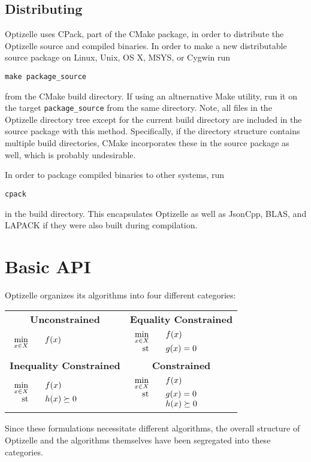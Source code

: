 \documentclass{report}
\makeatletter
\newcommand{\textct}{\begingroup\@activeus\@textct}
\newcommand*{\@textct}[1]{\texttt{#1}\endgroup}
\newcommand{\st}{\textnormal{st}}
\newcommand{\unconstrained}{\begin{array}[t]{rcl}\min\limits_{x\in X}&& f(x)\end{array}}
\newcommand{\equalityConstrained}{\begin{array}[t]{rcl}\min\limits_{x\in X}&&f(x)\\\st && g(x)=0\end{array}}
\newcommand{\inequalityConstrained}{\begin{array}[t]{rcl}\min\limits_{x\in X}&&f(x)\\\st && h(x)\succeq 0\end{array}}
\newcommand{\constrained}{\begin{array}[t]{rcl}\min\limits_{x\in X}&&f(x)\\\st && g(x)=0\\&&h(x)\succeq 0\end{array}}
\makeatother
\begin{document}
\section{Distributing}

        Optizelle uses CPack, part of the CMake package, in order to distribute the Optizelle source and compiled binaries.  In order to make a new distributable source package on Linux, Unix, OS X, MSYS, or Cygwin run 
\begin{center}
    \textct{make package_source}
\end{center}
from the CMake build directory.  If using an altnernative Make utility, run it on the target \textct{package_source} from the same directory.  Note, all files in the Optizelle directory tree except for the current build directory are included in the source package with this method.  Specifically, if the directory structure contains multiple build directories, CMake incorporates these in the source package as well, which is probably undesirable. 

        In order to package compiled binaries to other systems, run
\begin{center}
    \textct{cpack}
\end{center}
in the build directory.  This encapsulates Optizelle as well as JsonCpp, BLAS, and LAPACK if they were also built during compilation.

\chapter{Basic API}\label{ch:Basic}

       Optizelle organizes its algorithms into four different categories: 
    \begin{center}\begin{tabular}{|l|l|}\hline
    \multicolumn{1}{|c|}{\bf Unconstrained} &
    \multicolumn{1}{c|}{\bf Equality Constrained}\\
    $\unconstrained$ &
    $\equalityConstrained$ \\\hline
    \multicolumn{1}{|c|}{\bf Inequality Constrained} &
    \multicolumn{1}{c|}{\bf Constrained}\\
    $\inequalityConstrained$ &
    $\constrained$ \\\hline
    \end{tabular}\end{center}
Since these formulations necessitate different algorithms, the overall structure of Optizelle and the algorithms themselves have been segregated into these categories.  
\end{document}
